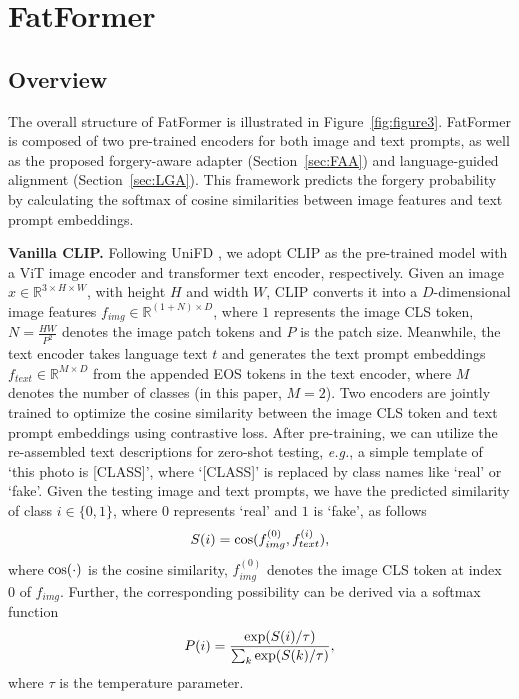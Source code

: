 \documentclass[10pt,twocolumn,letterpaper]{article}
\begin{document}
\section{FatFormer}
\subsection{Overview}
The overall structure of FatFormer is illustrated in Figure~\ref{fig:figure3}. FatFormer is composed of two pre-trained encoders for both image and text prompts, as well as the proposed forgery-aware adapter (Section~\ref{sec:FAA}) and language-guided alignment (Section~\ref{sec:LGA}). 
This framework predicts the forgery probability by calculating the softmax of cosine similarities between image features and text prompt embeddings.

\noindent \textbf{Vanilla CLIP.} Following UniFD \cite{ojha2023towards}, we adopt CLIP \cite{radford2021learning} as the pre-trained model with a ViT \cite{dosovitskiy2020image} image encoder and transformer \cite{vaswani2017attention} text encoder, respectively. Given an image $x\in \mathbb{R}^{3\times H \times W}$, with height $H$ and width $W$, CLIP converts it into a $D$-dimensional image features $f_{img}\in \mathbb{R}^{(1+N) \times D}$, where $1$ represents the image CLS token, $N=\frac{HW}{P^2}$ denotes the image patch tokens and $P$ is the patch size. Meanwhile, the text encoder takes language text $t$ and generates the text prompt embeddings $f_{text} \in \mathbb{R}^{M \times D}$ from the appended EOS tokens in the text encoder, where $M$ denotes the number of classes (in this paper, $M=2$). Two encoders are jointly trained to optimize the cosine similarity between the image CLS token and text prompt embeddings using contrastive loss. After pre-training, we can utilize the re-assembled text descriptions for zero-shot testing, {\em e.g.}, a simple template of `this photo is [CLASS]', where `[CLASS]' is replaced by class names like `real' or `fake'. Given the testing image and text prompts, we have the predicted similarity of class $i \in \{0, 1\}$, where $0$ represents `real' and $1$ is `fake', as follows
\begin{equation}
    S(i) = {\rm cos}(f_{img}^{(0)}, f_{text}^{(i)}), \label{eq:vanilla_clip}
\end{equation}
where ${\rm cos}(\cdot)$ is the cosine similarity, $f_{img}^{(0)}$ denotes the image CLS token at index $0$ of $f_{img}$. Further, the corresponding possibility can be derived via a softmax function
\begin{equation}
    P(i) = \frac{{\rm exp}(S(i) / \tau)}{\sum_{k}{\rm exp}(S(k) / \tau)},
\end{equation}
where $\tau$ is the temperature parameter.
\end{document}
